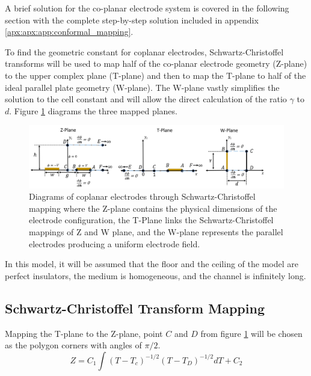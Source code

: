     \par A brief solution for the co-planar electrode system is covered in the following section with the complete step-by-step solution included in appendix \ref{apx:apx:app:conformal_mapping}.
    
    \par To find the geometric constant for coplanar electrodes, Schwartz-Christoffel transforms will be used to map half of the co-planar electrode geometry (Z-plane) to the upper complex plane (T-plane) and then to map the T-plane to half of the ideal parallel plate geometry (W-plane). The W-plane vastly simplifies the solution to the cell constant and will allow the direct calculation of the ratio $\gamma$ to $d$. Figure \ref{fig:scm_planes_models} diagrams the three mapped planes. 
  \begin{figure}[H]
        \centering
        \includegraphics[width=\textwidth]{images/scmPlanes.png}
        \caption[Diagrams of coplanar electrodes through Schwartz-Christoffel mapping]{Diagrams of coplanar electrodes through Schwartz-Christoffel mapping where the Z-plane contains the physical dimensions of the electrode configuration, the T-Plane links the Schwartz-Christoffel mappings of Z and W plane, and the W-plane represents the parallel electrodes producing a uniform electrode field.}
        \label{fig:scm_planes_models}
    \end{figure}

\par In this model, it will be assumed that the floor and the ceiling of the model are perfect insulators, the medium is homogeneous, and the channel is infinitely long.

\subsection*{Schwartz-Christoffel Transform Mapping}

  \par Mapping the T-plane to the Z-plane, point $C$ and $D$ from figure \ref{fig:scm_planes_models} will be chosen as the polygon corners with angles of $\pi/2$.  
   \begin{equation}
      Z = C_1\int (T-T_c)^{-1/2}(T-T_D)^{-1/2}dT + C_2
      \label{eqn:SCM_ZT_int}
  \end{equation}
  
